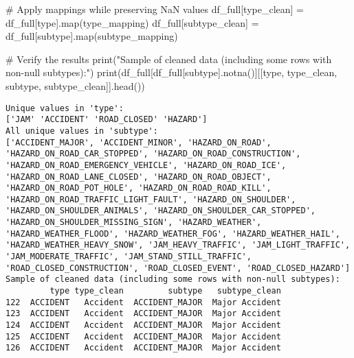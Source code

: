\documentclass[
  letterpaper,
  DIV=11,
  numbers=noendperiod]{scrartcl}
\newenvironment{Shaded}{\begin{snugshade}}{\end{snugshade}}
\newcommand{\BuiltInTok}[1]{\textcolor[rgb]{0.00,0.23,0.31}{#1}}
\newcommand{\CommentTok}[1]{\textcolor[rgb]{0.37,0.37,0.37}{#1}}
\newcommand{\NormalTok}[1]{\textcolor[rgb]{0.00,0.23,0.31}{#1}}
\newcommand{\OperatorTok}[1]{\textcolor[rgb]{0.37,0.37,0.37}{#1}}
\newcommand{\StringTok}[1]{\textcolor[rgb]{0.13,0.47,0.30}{#1}}
\begin{document}
\begin{Shaded}
\begin{Highlighting}[]
\CommentTok{\# Apply mappings while preserving NaN values}
\NormalTok{df\_full[}\StringTok{\textquotesingle{}type\_clean\textquotesingle{}}\NormalTok{] }\OperatorTok{=}\NormalTok{ df\_full[}\StringTok{\textquotesingle{}type\textquotesingle{}}\NormalTok{].}\BuiltInTok{map}\NormalTok{(type\_mapping)}
\NormalTok{df\_full[}\StringTok{\textquotesingle{}subtype\_clean\textquotesingle{}}\NormalTok{] }\OperatorTok{=}\NormalTok{ df\_full[}\StringTok{\textquotesingle{}subtype\textquotesingle{}}\NormalTok{].}\BuiltInTok{map}\NormalTok{(subtype\_mapping)}

\CommentTok{\# Verify the results}
\BuiltInTok{print}\NormalTok{(}\StringTok{"Sample of cleaned data (including some rows with non{-}null subtypes):"}\NormalTok{)}
\BuiltInTok{print}\NormalTok{(df\_full[df\_full[}\StringTok{\textquotesingle{}subtype\textquotesingle{}}\NormalTok{].notna()][[}\StringTok{\textquotesingle{}type\textquotesingle{}}\NormalTok{, }\StringTok{\textquotesingle{}type\_clean\textquotesingle{}}\NormalTok{, }\StringTok{\textquotesingle{}subtype\textquotesingle{}}\NormalTok{, }\StringTok{\textquotesingle{}subtype\_clean\textquotesingle{}}\NormalTok{]].head())}
\end{Highlighting}
\end{Shaded}

\begin{verbatim}
Unique values in 'type':
['JAM' 'ACCIDENT' 'ROAD_CLOSED' 'HAZARD']
All unique values in 'subtype':
['ACCIDENT_MAJOR', 'ACCIDENT_MINOR', 'HAZARD_ON_ROAD', 'HAZARD_ON_ROAD_CAR_STOPPED', 'HAZARD_ON_ROAD_CONSTRUCTION', 'HAZARD_ON_ROAD_EMERGENCY_VEHICLE', 'HAZARD_ON_ROAD_ICE', 'HAZARD_ON_ROAD_LANE_CLOSED', 'HAZARD_ON_ROAD_OBJECT', 'HAZARD_ON_ROAD_POT_HOLE', 'HAZARD_ON_ROAD_ROAD_KILL', 'HAZARD_ON_ROAD_TRAFFIC_LIGHT_FAULT', 'HAZARD_ON_SHOULDER', 'HAZARD_ON_SHOULDER_ANIMALS', 'HAZARD_ON_SHOULDER_CAR_STOPPED', 'HAZARD_ON_SHOULDER_MISSING_SIGN', 'HAZARD_WEATHER', 'HAZARD_WEATHER_FLOOD', 'HAZARD_WEATHER_FOG', 'HAZARD_WEATHER_HAIL', 'HAZARD_WEATHER_HEAVY_SNOW', 'JAM_HEAVY_TRAFFIC', 'JAM_LIGHT_TRAFFIC', 'JAM_MODERATE_TRAFFIC', 'JAM_STAND_STILL_TRAFFIC', 'ROAD_CLOSED_CONSTRUCTION', 'ROAD_CLOSED_EVENT', 'ROAD_CLOSED_HAZARD']
Sample of cleaned data (including some rows with non-null subtypes):
         type type_clean         subtype   subtype_clean
122  ACCIDENT   Accident  ACCIDENT_MAJOR  Major Accident
123  ACCIDENT   Accident  ACCIDENT_MAJOR  Major Accident
124  ACCIDENT   Accident  ACCIDENT_MAJOR  Major Accident
125  ACCIDENT   Accident  ACCIDENT_MAJOR  Major Accident
126  ACCIDENT   Accident  ACCIDENT_MAJOR  Major Accident
\end{verbatim}
\end{document}
